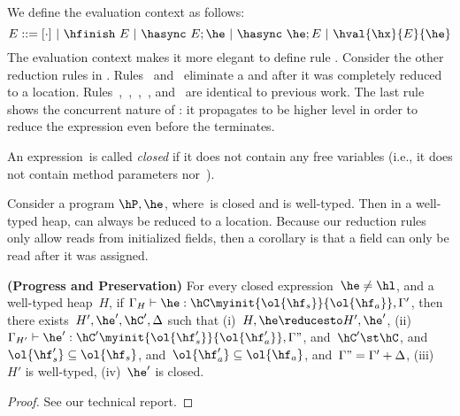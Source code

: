 We define the evaluation context as follows:
\[
E ::= [\cdot] ~|~ \hfinish~E ~|~ \hasync~E;\he ~|~ \hasync~\he;E ~|~ \hval{\hx}{E}{\he}
\]
The evaluation context makes it more elegant to define rule .
Consider the other reduction rules in .
Rules~ and~ eliminate a \finish and \async after it was completely reduced to a location.
Rules~,~,~,~, and~
    are identical to previous work.
The last rule~ shows the concurrent nature of \async:
    it propagates \async to be higher level in order to reduce the  expression
    even before the \async terminates.



An expression~\he is called \emph{closed} if it does not contain
    any free variables (i.e., it does not contain method parameters \hx nor~\this).


Consider a program $\hP,\he$, where~\he is closed and \hP is well-typed.
Then in a well-typed heap, \he can always be reduced to a location.
Because our reduction rules only allow reads from initialized fields,
    then a corollary is that a field can only be read after it was assigned.


\begin{Theorem}[preservation]
  \textbf{(Progress and Preservation)}
    For every closed expression~$\he \neq \hl$, and a well-typed heap~$H$,
        if $\Gamma_{H} \vdash \he : \hC\myinit{\ol{\hf_s}}{\ol{\hf_a}}, \Gamma'$,
        then there exists~$H',\he',\hC',\Delta$ such that
        (i)~$H,\he \reducesto H',\he'$,
        (ii)~$\Gamma_{H'} \vdash \he':\hC'\myinit{\ol{\hf'_s}}{\ol{\hf'_a}}, \Gamma"$,
        and~$\hC' \st \hC$,
        and~$\ol{\hf'_s} \subseteq \ol{\hf_s}$,
        and~$\ol{\hf'_a} \subseteq \ol{\hf_a}$,
        and~$\Gamma" = \Gamma'+\Delta$,
        (iii)~$H'$ is well-typed,
        (iv)~$\he'$ is closed.
\end{Theorem}
\begin{proof}
See our technical report.
\end{proof}
